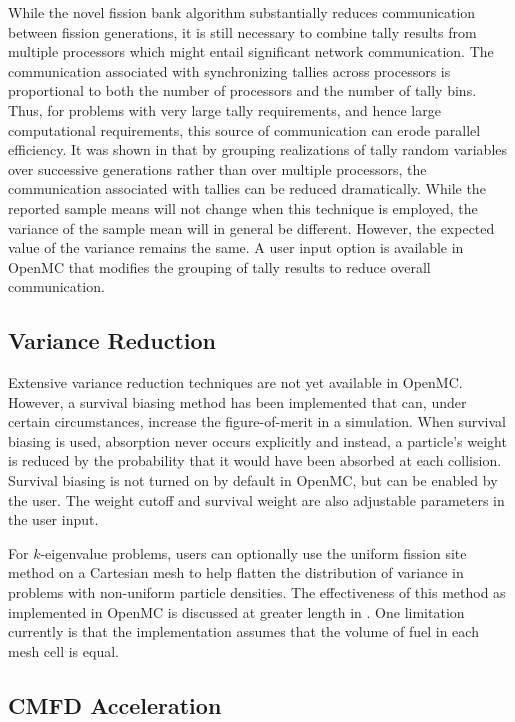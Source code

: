 \documentclass[5p,authoryear]{elsarticle}
\begin{document}
While the novel fission bank algorithm substantially reduces communication
between fission generations, it is still necessary to combine tally results from
multiple processors which might entail significant network communication. The
communication associated with synchronizing tallies across processors is
proportional to both the number of processors and the number of tally
bins. Thus, for problems with very large tally requirements, and hence large
computational requirements, this source of communication can erode parallel
efficiency. It was shown in \citep{trans-romano-2012} that by grouping
realizations of tally random variables over successive generations rather than
over multiple processors, the communication associated with tallies can be
reduced dramatically. While the reported sample means will not change when this
technique is employed, the variance of the sample mean will in general be
different. However, the expected value of the variance remains the same. A user
input option is available in OpenMC that modifies the grouping of tally results
to reduce overall communication.

\subsection{Variance Reduction}

Extensive variance reduction techniques are not yet available in
OpenMC. However, a survival biasing method has been implemented that can, under
certain circumstances, increase the figure-of-merit in a simulation. When
survival biasing is used, absorption never occurs explicitly and instead, a
particle's weight is reduced by the probability that it would have been absorbed
at each collision. Survival biasing is not turned on by default in OpenMC, but
can be enabled by the user. The weight cutoff and survival weight are also
adjustable parameters in the user input.

For $k$-eigenvalue problems, users can optionally use the uniform fission site
method \citep{physor-kelly-2012} on a Cartesian mesh to help flatten the
distribution of variance in problems with non-uniform particle densities. The
effectiveness of this method as implemented in OpenMC is discussed at greater
length in \citep{mc-romano-2013}. One limitation currently is that the
implementation assumes that the volume of fuel in each mesh cell is equal. 

\subsection{CMFD Acceleration}
\end{document}

